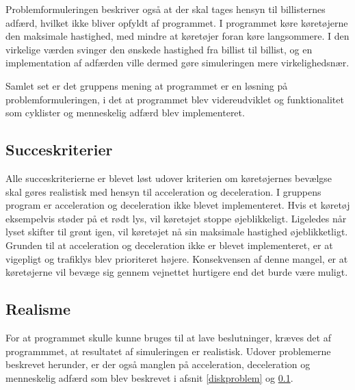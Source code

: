 \vspace{5mm}
Problemformuleringen beskriver også at der skal tages hensyn til billisternes adfærd, hvilket ikke bliver opfyldt af programmet. I programmet køre køretøjerne den maksimale hastighed, med mindre at køretøjer foran køre langsommere. I den virkelige værden svinger den ønskede hastighed fra billist til billist, og en implementation af adfærden ville dermed gøre simuleringen mere virkelighedsnær.

\vspace{5mm}
Samlet set er det gruppens mening at programmet er en løsning på problemformuleringen, i det at programmet blev videreudviklet og funktionalitet som cyklister og menneskelig adfærd blev implementeret.

\subsection{Succeskriterier}\label{disksucces}
Alle succeskriterierne er blevet løst udover kriterien om køretøjernes bevælgse skal gøres realistisk med hensyn til acceleration og deceleration. I gruppens program er acceleration og deceleration ikke blevet implementeret. Hvis et køretøj eksempelvis støder på et rødt lys, vil køretøjet stoppe øjeblikkeligt. Ligeledes når lyset skifter til grønt igen, vil køretøjet nå sin maksimale hastighed øjeblikketligt. Grunden til at acceleration og deceleration ikke er blevet implementeret, er at vigepligt og trafiklys blev prioriteret højere. Konsekvensen af denne mangel, er at køretøjerne vil bevæge sig gennem vejnettet hurtigere end det burde være muligt.

\subsection{Realisme}
For at programmet skulle kunne bruges til at lave beslutninger, kræves det af programmmet, at resultatet af simuleringen er realistisk. Udover problemerne beskrevet herunder, er der også manglen på acceleration, deceleration og menneskelig adfærd som blev beskrevet i afsnit \ref{diskproblem} og \ref{disksucces}.

